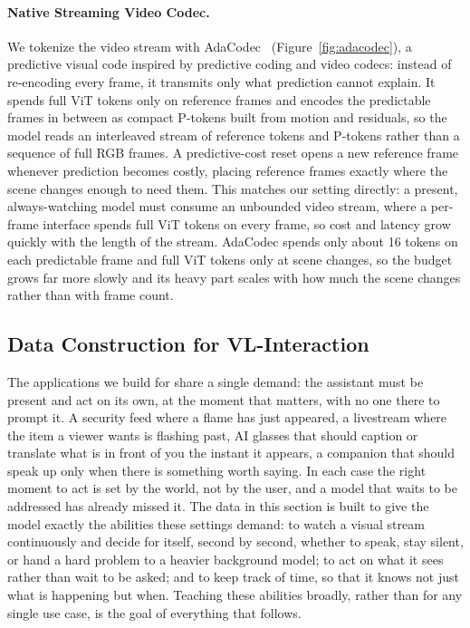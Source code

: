 \documentclass{llmxive}
\begin{document}
\paragraph{\textbf{Native Streaming Video Codec.}}
We tokenize the video stream with AdaCodec~\cite{hou2026adacodecpredictivevisualcode} (Figure~\ref{fig:adacodec}), a predictive visual code inspired by predictive coding and video codecs: instead of re-encoding every frame, it transmits only what prediction cannot explain. It spends full ViT tokens only on reference frames and encodes the predictable frames in between as compact P-tokens built from motion and residuals, so the model reads an interleaved stream of reference tokens and P-tokens rather than a sequence of full RGB frames. A predictive-cost reset opens a new reference frame whenever prediction becomes costly, placing reference frames exactly where the scene changes enough to need them. This matches our setting directly: a present, always-watching model must consume an unbounded video stream, where a per-frame interface spends full ViT tokens on every frame, so cost and latency grow quickly with the length of the stream. AdaCodec spends only about 16 tokens on each predictable frame and full ViT tokens only at scene changes, so the budget grows far more slowly and its heavy part scales with how much the scene changes rather than with frame count.





\subsection{Data Construction for VL-Interaction }
\label{sec:data}

The applications we build for share a single demand: the assistant must be present and act on its own, at the moment that matters, with no one there to prompt it. A security feed where a flame has just appeared, a livestream where the item a viewer wants is flashing past, AI glasses that should caption or translate what is in front of you the instant it appears, a companion that should speak up only when there is something worth saying. In each case the right moment to act is set by the world, not by the user, and a model that waits to be addressed has already missed it. The data in this section is built to give the model exactly the abilities these settings demand: to watch a visual stream continuously and decide for itself, second by second, whether to speak, stay silent, or hand a hard problem to a heavier background model; to act on what it sees rather than wait to be asked; and to keep track of time, so that it knows not just what is happening but when. Teaching these abilities broadly, rather than for any single use case, is the goal of everything that follows. 
\end{document}
